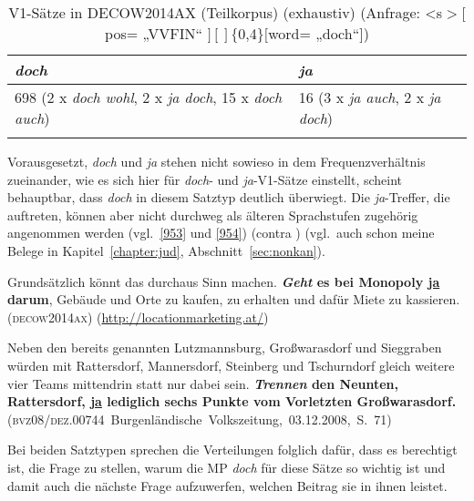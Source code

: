 {\begin{table}
	\caption{\label{tab:952}V1-Sätze in DECOW2014AX (Teilkorpus) (exhaustiv) (Anfrage: {\ttfamily\textless s$>[$pos= „VVFIN“ $][]\lbrace$0,4$\rbrace[$word= „doch“]})}
    \begin{tabular}[t]{ll}
    \lsptoprule
    \textit{doch} & \textit{ja}\\\midrule 
    698 (2 x \textit{doch wohl}, 2 x \textit{ja doch}, 15 x \textit{doch auch}) & 16 (3 x \textit{ja auch}, 2 x \textit{ja doch})\\
    \lspbottomrule
    \end{tabular}   
\end{table}
Vorausgesetzt, \textit{doch} und \textit{ja} stehen nicht sowieso in dem Frequenzverhältnis zuein\-ander, wie es sich hier für \textit{doch}- und \textit{ja}-V1-Sätze einstellt, scheint behauptbar, dass \textit{doch} in diesem Satztyp deutlich überwiegt. Die \textit{ja}-Treffer, die auftreten, können aber nicht durchweg als älteren Sprachstufen zugehörig angenommen werden (vgl.\ \ref{953} und \ref{954}) (contra \citealt[158]{Oennerfors1997}) (vgl.\ auch schon meine Belege in Kapitel~\ref{chapter:jud}, Abschnitt~\ref{sec:nonkan}).

\begin{exe}
	\ex\label{953}

	Grundsätzlich könnt das durchaus Sinn machen. \textbf{\textit{Geht} es bei Monopoly \ul{ja} darum}, Gebäude und Orte zu kaufen, zu erhalten und 		dafür Miete zu kassieren. 			      
	\hfill\hbox{\scshape(decow2014ax)}
	\newline  
	{\scriptsize(\url{http://locationmarketing.at/})}
\end{exe}
								          
\begin{exe}
	\ex\label{954}

	Neben den bereits genannten Lutzmannsburg, Großwarasdorf und Sieggraben würden mit Rattersdorf, Mannersdorf, Steinberg und Tschurndorf gleich weitere 		vier Teams mittendrin statt nur dabei sein. \textbf{\textit{Trennen} den Neunten, Rattersdorf, \ul{ja} lediglich sechs Punkte vom Vorletzten 		Großwarasdorf.} 			      
	\newline  
	\hbox{}\hfill\hbox{(\textsc{bvz08/dez.00744} Burgenländische Volkszeitung, 03.12.2008, S. 71)}
\end{exe} 
Bei beiden Satztypen sprechen die Verteilungen folglich dafür, dass es berechtigt ist, die Frage zu stellen, warum die MP \textit{doch} für diese Sätze so wichtig ist und damit auch die nächste Frage aufzuwerfen, welchen Beitrag sie in ihnen leistet.
	
}
